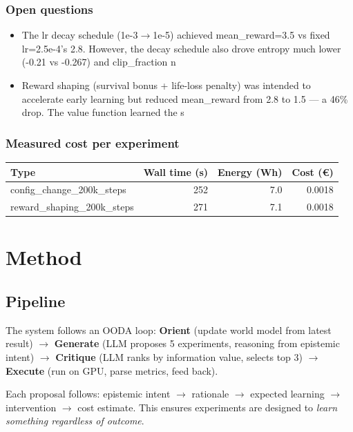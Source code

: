 \documentclass[10pt,a4paper,twocolumn]{article}
\begin{document}
\subsubsection*{Open questions}
\begin{itemize}
\small
  \item The lr decay schedule (1e-3$\to$1e-5) achieved mean\_reward=3.5 vs fixed lr=2.5e-4's 2.8. However, the decay schedule also drove entropy much lower (-0.21 vs -0.267) and clip\_fraction n
  \item Reward shaping (survival bonus + life-loss penalty) was intended to accelerate early learning but reduced mean\_reward from 2.8 to 1.5 — a 46\% drop. The value function learned the s
\end{itemize}

\subsubsection*{Measured cost per experiment}
\begin{table}[h]
\centering
\small
\begin{tabular}{lrrr}
\toprule
Type & Wall time (s) & Energy (Wh) & Cost (\euro{{}}) \\
\midrule
  config\_change\_200k\_steps & 252 & 7.0 & 0.0018 \\
  reward\_shaping\_200k\_steps & 271 & 7.1 & 0.0018 \\
\bottomrule
\end{tabular}
\end{table}


    \section{Method}

    \subsection*{Pipeline}
    The system follows an OODA loop:
    \textbf{Orient} (update world model from latest result) $\to$
    \textbf{Generate} (LLM proposes 5 experiments, reasoning from epistemic intent) $\to$
    \textbf{Critique} (LLM ranks by information value, selects top 3) $\to$
    \textbf{Execute} (run on GPU, parse metrics, feed back).

    Each proposal follows: epistemic intent $\to$ rationale $\to$
    expected learning $\to$ intervention $\to$ cost estimate.
    This ensures experiments are designed to \emph{learn something regardless of outcome}.
\end{document}
